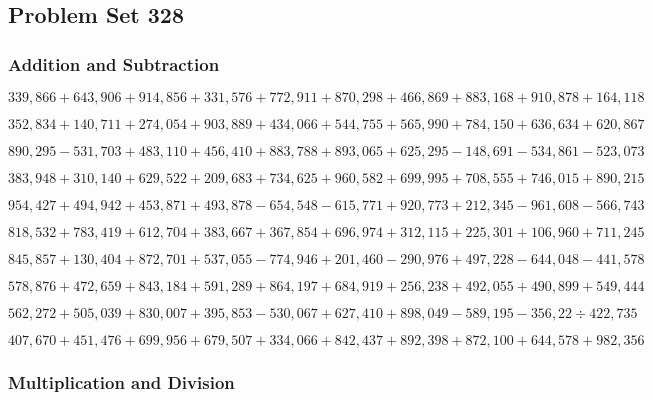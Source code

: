 \hypertarget{problem-set-328}{%
\subsection{Problem Set 328}\label{problem-set-328}}

\hypertarget{addition-and-subtraction}{%
\subsubsection{Addition and
Subtraction}\label{addition-and-subtraction}}

\(339,866+643,906+914,856+331,576+772,911+870,298+466,869+883,168+910,878+164,118\)

\(352,834+140,711+274,054+903,889+434,066+544,755+565,990+784,150+636,634+620,867\)

\(890,295-531,703+483,110+456,410+883,788+893,065+625,295-148,691-534,861-523,073\)

\(383,948+310,140+629,522+209,683+734,625+960,582+699,995+708,555+746,015+890,215\)

\(954,427+494,942+453,871+493,878-654,548-615,771+920,773+212,345-961,608-566,743\)

\(818,532+783,419+612,704+383,667+367,854+696,974+312,115+225,301+106,960+711,245\)

\(845,857+130,404+872,701+537,055-774,946+201,460-290,976+497,228-644,048-441,578\)

\(578,876+472,659+843,184+591,289+864,197+684,919+256,238+492,055+490,899+549,444\)

\(562,272+505,039+830,007+395,853-530,067+627,410+898,049-589,195-356,22÷422,735\)

\(407,670+451,476+699,956+679,507+334,066+842,437+892,398+872,100+644,578+982,356\)

\hypertarget{multiplication-and-division}{%
\subsubsection{Multiplication and
Division}\label{multiplication-and-division}}

